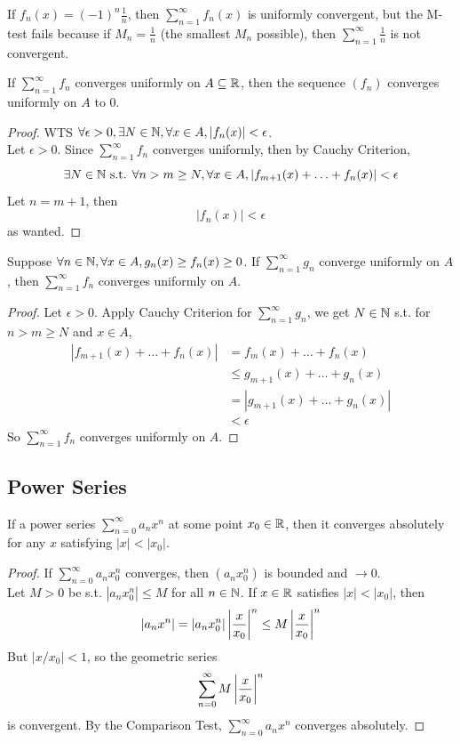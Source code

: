 \documentclass[11pt]{article}
\begin{document}
\example If $f_n(x) = (-1)^n\frac{1}{n}$, then $\sum_{n=1}^\infty f_n(x)$ is uniformly convergent, but the M-test fails because if $M_n = \frac{1}{n}$ (the smallest $M_n$ possible), then $\sum_{n=1}^\infty \frac{1}{n}$ is not convergent.


\corollary If $\sum_{n=1}^\infty f_n$ converges uniformly on $A \subseteq \mathbb{R}$, then the sequence $(f_n)$ converges uniformly on $A$ to 0.
\begin{proof}
	WTS $\forall \epsilon > 0, \exists N \in \mathbb{N}, \forall x \in A, |f_n(x)| < \epsilon$.\\
	Let $\epsilon > 0$. Since $\sum_{n=1}^\infty f_n$ converges uniformly, then by Cauchy Criterion, 
	$$\exists N \in \mathbb{N} \text{ s.t. } \forall n > m \geq N, \forall x \in A, |f_{m+1}(x) + \hdots + f_n(x)|< \epsilon$$
	Let $n = m+1$, then
	$$|f_n(x)| < \epsilon$$
	as wanted.
\end{proof}

\corollary Suppose $\forall n \in \mathbb{N}, \forall x \in A, g_n(x) \geq f_n(x) \geq 0$. If $\sum_{n=1}^\infty g_n$ converge uniformly on $A$, then $\sum_{n=1}^\infty f_n$ converges uniformly on $A$.
\begin{proof}
	Let $\epsilon > 0$. Apply Cauchy Criterion for $\sum_{n=1}^\infty g_n$, we get $N \in \mathbb{N}$ s.t. for $n > m \geq N$ and $x \in A$,
	\begin{align*}
		|f_{m+1}(x) + \hdots + f_n(x) | &= f_m(x) + \hdots + f_n(x) \\
		&\leq g_{m+1}(x) + \hdots + g_n(x) \\
		&= |g_{m+1}(x) + \hdots + g_n(x) |\\
		&< \epsilon
	\end{align*}
So $\sum_{n=1}^\infty f_n$ converges uniformly on $A$.
\end{proof}

\subsection{Power Series}
\theorem If a power series $\sum_{n=0}^\infty a_nx^n$  at some point $x_0 \in \mathbb{R}$, then it converges absolutely for any $x$ satisfying $|x| < |x_0|$.
\begin{proof}
	If $\sum_{n=0}^\infty a_nx_0^n$ converges, then $(a_nx_0^n)$ is bounded and $\rightarrow 0$.\\
	Let $M > 0$ be s.t. $|a_nx_0^n| \leq M$ for all $n \in \mathbb{N}$. If $x \in \mathbb{R}$ satisfies $|x| < |x_0|$, then
	$$|a_nx^n| = |a_nx_0^n|\left \vert {\frac{x}{x_0}} \right \vert^n \leq M\left \vert {\frac{x}{x_0}} \right \vert^n$$
	But $|x / x_0| < 1$, so the geometric series
	$$\sum_{n=0}^\infty M \left \vert {\frac{x}{x_0}} \right \vert^n$$ 
	is convergent. By the Comparison Test, $\sum_{n=0}^\infty a_nx^n$ converges absolutely.
\end{proof} 
\end{document}
